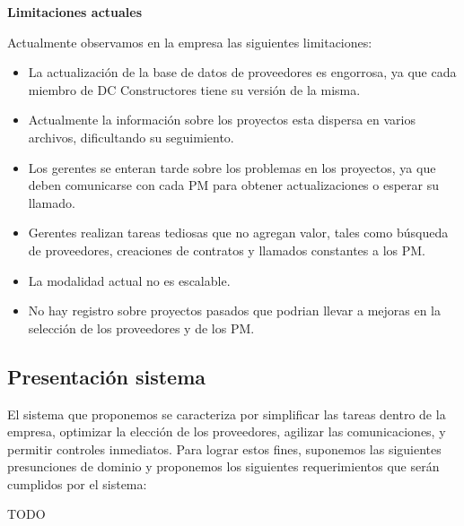 \textbf{Limitaciones actuales}

Actualmente observamos en la empresa las siguientes limitaciones:
\begin{itemize}
    \item La actualización de la base de datos de proveedores es engorrosa, ya que cada miembro de DC Constructores tiene su versión de la misma.
    \item Actualmente la información sobre los proyectos esta dispersa en varios archivos, dificultando su seguimiento.
    \item Los gerentes se enteran tarde sobre los problemas en los proyectos, ya que deben comunicarse con cada PM para obtener actualizaciones o esperar su llamado.
    \item Gerentes realizan tareas tediosas que no agregan valor, tales como búsqueda de proveedores, creaciones de contratos y llamados constantes a los PM.
    \item La modalidad actual no es escalable.
    \item No hay registro sobre proyectos pasados que podrian llevar a mejoras en la selección de los proveedores y de los PM.
\end{itemize}

\subsection{Presentación sistema}
El sistema que proponemos se caracteriza por simplificar las tareas dentro de la empresa, optimizar la elección de los proveedores, agilizar las comunicaciones, y permitir controles inmediatos. Para lograr estos fines, suponemos las siguientes presunciones de dominio y proponemos los siguientes requerimientos que serán cumplidos por el sistema:

TODO
